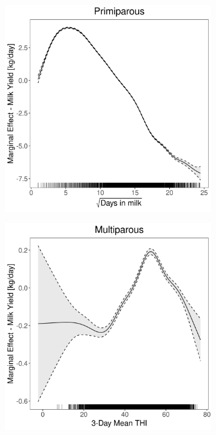 \begin{figure}[H]
\begin{subfigure}[b]{0.45\textwidth}
    \end{subfigure}
    \hspace{0.05\textwidth} %
    \begin{subfigure}[b]{0.45\textwidth}
        \centering
        \includegraphics[width=\textwidth]{thesis/figures/models/milk/after2010/ob_milk_after2010/ob_milk_after2010_marginal_dim_milk_primi.png}
    \end{subfigure}
    \begin{subfigure}[b]{0.45\textwidth}
        \centering
        \includegraphics[width=\textwidth]{thesis/figures/models/milk/after2010/ob_milk_after2010/ob_milk_after2010_marginal_thi_milk_multi.png}

\end{subfigure}
\end{figure}
